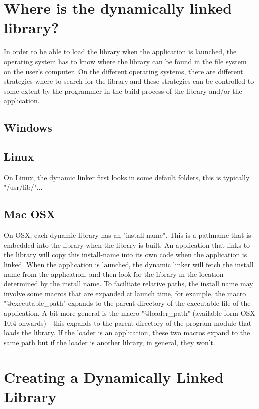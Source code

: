 \section{Where is the dynamically linked library?}
In order to be able to load the library when the application is launched, the operating system has to know where the library can be found in the file system on the user's computer. On the different operating systems, there are different strategies where to search for the library and these strategies can be controlled to some extent by the programmer in the build process of the library and/or the application.

\subsection{Windows}

\subsection{Linux}
On Linux, the dynamic linker first looks in some default folders, this is typically "/usr/lib/"...

\subsection{Mac OSX}
On OSX, each dynamic library has an "install name". This is a pathname that is embedded into the library when the library is built. An application that links to the library will copy this install-name into its own code when the application is linked. When the application is launched, the dynamic linker will fetch the install name from the application, and then look for the library in the location determined by the install name. To facilitate relative paths, the install name may involve some macros that are expanded at launch time, for example, the macro "@executable\_path" expands to the parent directory of the executable file of the application. A bit more general is the macro "@loader\_path" (available form OSX 10.4 onwards) - this expands to the parent directory of the program module that loads the library. If the loader is an application, these two macros expand to the same path but if the loader is another library, in general, they won't.



\section{Creating a Dynamically Linked Library}


